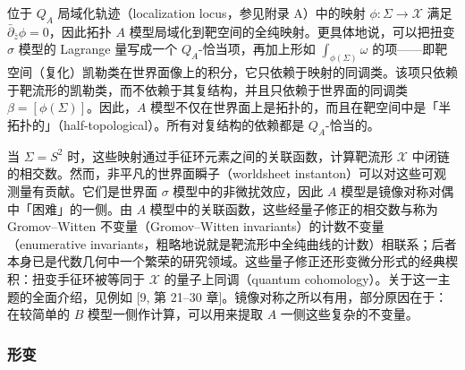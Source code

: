 
位于 $Q_A$ 局域化轨迹（localization locus，参见附录 A）中的映射 $\phi\colon\Sigma\to\mathcal{X}$ 满足 $\bar\partial_{\bar z}\phi=0$，因此拓扑 $A$ 模型局域化到靶空间的全纯映射。更具体地说，可以把扭变 $\sigma$ 模型的 Lagrange 量写成一个 $Q_A$-恰当项，再加上形如 $\int_{\phi(\Sigma)}\omega$ 的项——即靶空间（复化）凯勒类在世界面像上的积分，它只依赖于映射的同调类。该项只依赖于靶流形的凯勒类，而不依赖于其复结构，并且只依赖于世界面的同调类 $\beta=[\phi(\Sigma)]$。因此，$A$ 模型不仅在世界面上是拓扑的，而且在靶空间中是「半拓扑的」（half-topological）。所有对复结构的依赖都是 $Q_A$-恰当的。


当 $\Sigma=S^{2}$ 时，这些映射通过手征环元素之间的关联函数，计算靶流形 $\mathcal{X}$ 中闭链的相交数。然而，非平凡的世界面瞬子（worldsheet instanton）可以对这些可观测量有贡献。它们是世界面 $\sigma$ 模型中的非微扰效应，因此 $A$ 模型是镜像对称对偶中「困难」的一侧。由 $A$ 模型中的关联函数，这些经量子修正的相交数与称为 Gromov--Witten 不变量（Gromov--Witten invariants）的计数不变量（enumerative invariants，粗略地说就是靶流形中全纯曲线的计数）相联系；后者本身已是代数几何中一个繁荣的研究领域。这些量子修正还形变微分形式的经典楔积：扭变手征环被等同于 $\mathcal{X}$ 的量子上同调（quantum cohomology）。关于这一主题的全面介绍，见例如 [9, 第 21--30 章]。镜像对称之所以有用，部分原因在于：在较简单的 $B$ 模型一侧作计算，可以用来提取 $A$ 一侧这些复杂的不变量。


\subsubsection{形变}

